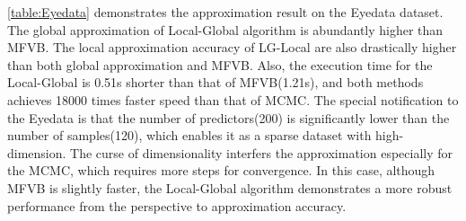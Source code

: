 \autoref{table:Eyedata} demonstrates the approximation result on the Eyedata dataset.  The global approximation of Local-Global algorithm is abundantly higher than MFVB.  The local approximation accuracy of LG-Local are also drastically higher than both global approximation and MFVB. Also, the execution time for the Local-Global is 0.51s shorter than that of MFVB(1.21s), and both methods achieves 18000 times faster speed than that of MCMC.
The special notification to the Eyedata is that the number of predictors(200) is significantly lower than the number of samples(120), which enables it as a sparse dataset with high-dimension. The curse of dimensionality interfers the approximation especially for the MCMC, which requires more steps for convergence. In this case, although MFVB is slightly faster, the Local-Global algorithm demonstrates a more robust performance from the perspective to approximation accuracy.





